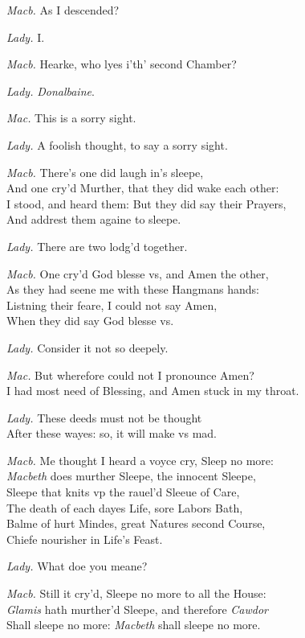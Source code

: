 \documentclass[12pt]{sides}
\newcommand{\dia}[1]{\hskip 15pt\textit{#1}\hskip 6pt}
\begin{document}
\begin{multicols}{2}
            \dia{Macb.} As I descended?

            \dia{Lady.} I.

            \dia{Macb.} Hearke, who lyes i'th' second Chamber?

            \dia{Lady.} \textit{Donalbaine}.

            \dia{Mac.} This is a sorry sight.

            \dia{Lady.} A foolish thought, to say a sorry sight.

            \dia{Macb.} There's one did laugh in's sleepe, \\ And one cry'd Murther, that they did wake each other: \\ I stood, and heard them: But they did say their Prayers, \\ And addrest them againe to sleepe.

            \dia{Lady.} There are two lodg'd together.

            \dia{Macb.} One cry'd God blesse vs, and Amen the other, \\ As they had seene me with these Hangmans hands: \\ Listning their feare, I could not say Amen, \\ When they did say God blesse vs.

            \dia{Lady.} Consider it not so deepely.

            \dia{Mac.} But wherefore could not I pronounce Amen? \\ I had most need of Blessing, and Amen stuck in my throat.

            \dia{Lady.} These deeds must not be thought \\ After these wayes: so, it will make vs mad.

            \dia{Macb.} Me thought I heard a voyce cry, Sleep no more: \\ \textit{Macbeth} does murther Sleepe, the innocent Sleepe, \\ Sleepe that knits vp the rauel'd Sleeue of Care, \\ The death of each dayes Life, sore Labors Bath, \\ Balme of hurt Mindes, great Natures second Course, \\ Chiefe nourisher in Life's Feast.

            \dia{Lady.} What doe you meane?

            \dia{Macb.} Still it cry'd, Sleepe no more to all the House: \\ \textit{Glamis} hath murther'd Sleepe, and therefore \textit{Cawdor} \\ Shall sleepe no more: \dia{Macbeth} shall sleepe no more.


\end{multicols}
\end{document}

